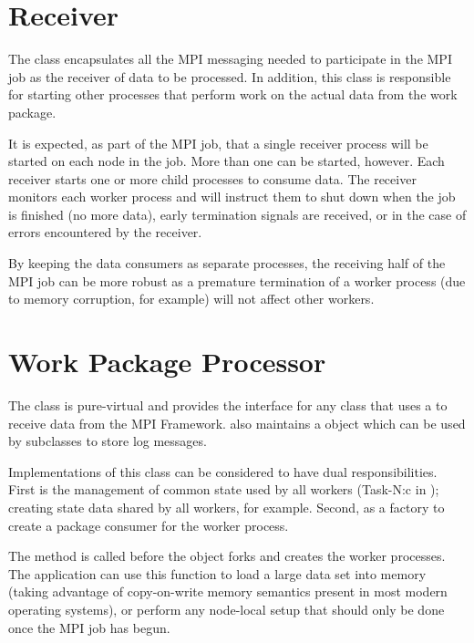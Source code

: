 \section{Receiver}
\label{sec-workpackagereceiver}

The  class encapsulates all the MPI messaging needed to
participate in the MPI job as the receiver of data to be processed. In
addition, this class is responsible for starting other processes that
perform work on the actual data from the work package.

It is expected, as part of the MPI job, that a single receiver process
will be started on each node in the job. More than one can be started,
however. Each receiver starts one or more child processes to
consume data. The receiver monitors each worker process and
will instruct them to shut down when the job is finished (no more data),
early termination signals are received, or in the case of errors
encountered by the receiver.

By keeping the data consumers as separate processes, the receiving half
of the MPI job can be more robust as a premature termination of a worker
process (due to memory corruption, for example) will not affect other
workers.

\section{Work Package Processor}
\label{sec-workpackageprocessor}

The  class is pure-virtual and provides the
interface for any class that uses a  to receive data from
the MPI Framework.
 also maintains a  object which
can be used by subclasses to store log messages.

Implementations of this class can be considered to have dual responsibilities.
First is the management of common state used by all workers (Task-N:c in
); creating state data shared by all workers, for
example.
Second, as a factory to create a package consumer for the worker process.

The  method is called before the 
object forks and creates the worker processes. The application can use this
function to load a large data set into memory (taking advantage of copy-on-write
memory semantics present in most modern operating systems), or perform any
node-local setup that should only be done once the MPI job has begun.

